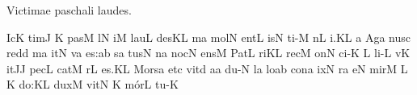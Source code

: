
\beginhymn Victimae paschali laudes.

\nosolesmescustos
{}\Internote
{}
\initiumgregorianum
{}%
\sgn {}Ic\punctum K\egn
\sgn tim\punctum J\egn
\sgn {}{\ae}{}\punctum K\egn
\spatium
\sgn pas\punctum M\egn
{}l\punctum N\egn
\sgn {}i{}\punctum M\egn
\spatium
\sgn l{a}u\punctum L\egn
\sgn des\punctum K\augmentum L\egn
\spatium
\Asteriscus
\divisiominima
\spatium
\sgn {}{\'\i}m\punctum a\egn
\sgn mol\punctum N\egn
\sgn {}e{nt}\punctum L\egn
\spatium
{}is\punctum N\egn
\sgn ti-\punctum M\egn
{}n\punctum L\egn
\sgn {}i.\punctum K\augmentum L\egn
\spatium
\divisiofinalis
\spatium
\custos a
\lineaproxima
\sgn {}Ag\punctum a\egn
\sgn nus\punctum c\egn
\spatium
\sgn red\punctum d\egn
{}m\punctum a\egn
\sgn {}it\punctum N\egn
\spatium
{}v\punctum a\egn
\sgn {}e{s:}\punctum a\augmentum b\egn
\spatium
\divisiominor
\spatium
{}s\punctum a\egn
\sgn tus\punctum N\egn
\spatium
\sgn {}{\'\i}n\punctum a\egn
\sgn noc\punctum N\egn
\sgn {}e{ns}\punctum M\egn
\spatium
\sgn P{a}t\punctum L\egn
\sgn ri{}\punctum K\augmentum L\egn
\spatium
\divisiominima
\spatium
\sgn rec\punctum M\egn
\sgn {}on\punctum N\egn
\sgn ci-\punctum K\egn
\custos L
\lineaproxima
\sgn li-\punctum L\egn
{}v\punctum K\egn
\sgn {}it\punctum J\augmentum J\egn
\spatium
\sgn pec\engl{}\punctum L\egn
\sgn cat\punctum M\egn
{}r\punctum L\egn
\sgn {}e{s.}\punctum K\augmentum L\egn
\spatium
\divisiofinalis
\spatium
\sgn Mo{rs}\punctum a\egn
\spatium
\sgn {}et\punctum c\egn
\spatium
\sgn v{i}t\engl{}\punctum d\egn
\sgn {}a{}\punctum a\egn
\spatium
\sgn du-\punctum N\egn
{}l\punctum a\egn
\sgn lo{}\punctum a\augmentum b\egn
\spatium
\divisiominima
\spatium
\sgn con\punctum a\egn
{}ix\punctum N\egn
{}r\punctum a\egn
\sgn {}e{}\punctum N\egn
\spatium
\sgn mir\punctum M\egn
{}\punctum L\egn
{}\Internote
\custos K
\lineaproxima
\sgn do:\punctum K\augmentum L\egn
\spatium
\divisiominor
\spatium
\sgn dux\punctum M\egn
\spatium
\sgn v{i}t\punctum N\egn
\sgn {}{\ae}{}\punctum K\egn
\spatium
\sgn m{\'o}r\punctum L\egn
\sgn tu-\punctum K\egn
